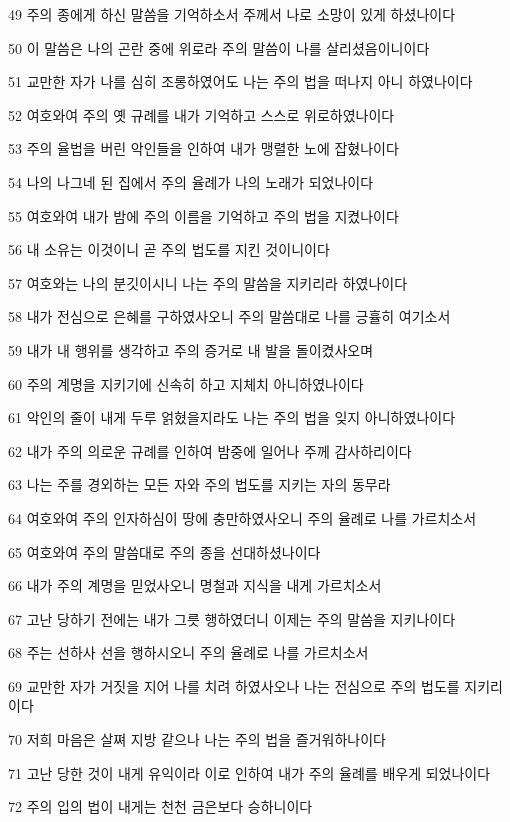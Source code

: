 \par 49 주의 종에게 하신 말씀을 기억하소서 주께서 나로 소망이 있게 하셨나이다
\par 50 이 말씀은 나의 곤란 중에 위로라 주의 말씀이 나를 살리셨음이니이다
\par 51 교만한 자가 나를 심히 조롱하였어도 나는 주의 법을 떠나지 아니 하였나이다
\par 52 여호와여 주의 옛 규례를 내가 기억하고 스스로 위로하였나이다
\par 53 주의 율법을 버린 악인들을 인하여 내가 맹렬한 노에 잡혔나이다
\par 54 나의 나그네 된 집에서 주의 율례가 나의 노래가 되었나이다
\par 55 여호와여 내가 밤에 주의 이름을 기억하고 주의 법을 지켰나이다
\par 56 내 소유는 이것이니 곧 주의 법도를 지킨 것이니이다
\par 57 여호와는 나의 분깃이시니 나는 주의 말씀을 지키리라 하였나이다
\par 58 내가 전심으로 은혜를 구하였사오니 주의 말씀대로 나를 긍휼히 여기소서
\par 59 내가 내 행위를 생각하고 주의 증거로 내 발을 돌이켰사오며
\par 60 주의 계명을 지키기에 신속히 하고 지체치 아니하였나이다
\par 61 악인의 줄이 내게 두루 얽혔을지라도 나는 주의 법을 잊지 아니하였나이다
\par 62 내가 주의 의로운 규례를 인하여 밤중에 일어나 주께 감사하리이다
\par 63 나는 주를 경외하는 모든 자와 주의 법도를 지키는 자의 동무라
\par 64 여호와여 주의 인자하심이 땅에 충만하였사오니 주의 율례로 나를 가르치소서
\par 65 여호와여 주의 말씀대로 주의 종을 선대하셨나이다
\par 66 내가 주의 계명을 믿었사오니 명철과 지식을 내게 가르치소서
\par 67 고난 당하기 전에는 내가 그릇 행하였더니 이제는 주의 말씀을 지키나이다
\par 68 주는 선하사 선을 행하시오니 주의 율례로 나를 가르치소서
\par 69 교만한 자가 거짓을 지어 나를 치려 하였사오나 나는 전심으로 주의 법도를 지키리이다
\par 70 저희 마음은 살쪄 지방 같으나 나는 주의 법을 즐거워하나이다
\par 71 고난 당한 것이 내게 유익이라 이로 인하여 내가 주의 율례를 배우게 되었나이다
\par 72 주의 입의 법이 내게는 천천 금은보다 승하니이다
